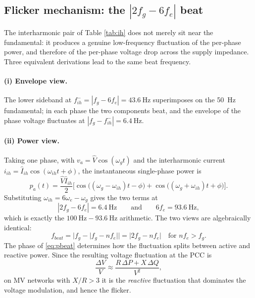\documentclass[11pt,a4paper]{article}
\begin{document}
\subsection{Flicker mechanism: the $|2f_{g}-6f_{e}|$ beat}
\label{sec:flicker}

The interharmonic pair of Table \ref{tab:ih} does not merely sit near the
fundamental: it produces a genuine low-frequency fluctuation of the per-phase
power, and therefore of the per-phase voltage drop across the supply impedance.
Three equivalent derivations lead to the same beat frequency.

\paragraph{(i) Envelope view.} The lower sideband at
$f_{ih}^{-}=|f_{g}-6f_{e}|=\SI{43.6}{\hertz}$ superimposes on the
\SI{50}{\hertz} fundamental; in each phase the two components beat, and the
envelope of the phase voltage fluctuates at $|f_{g}-f_{ih}^{-}|=\SI{6.4}{\hertz}$.

\paragraph{(ii) Power view.} Taking one phase, with
$v_{a}=\hat{V}\cos(\omega_{g}t)$ and the interharmonic current
$i_{ih}=\hat{I}_{ih}\cos(\omega_{ih}t+\phi)$, the instantaneous single-phase
power is
\begin{equation}
p_{a}(t)=\frac{\hat{V}\hat{I}_{ih}}{2}
\Big[\cos\big((\omega_{g}-\omega_{ih})t-\phi\big)
+\cos\big((\omega_{g}+\omega_{ih})t+\phi\big)\Big].
\label{eq:pbeat}
\end{equation}
Substituting $\omega_{ih}=6\omega_{e}-\omega_{g}$ gives the two terms at
\begin{equation}
|2f_{g}-6f_{e}| = \SI{6.4}{\hertz}
\qquad\text{and}\qquad
6f_{e} = \SI{93.6}{\hertz},
\end{equation}
which is exactly the $\SI{100}{\hertz}-\SI{93.6}{\hertz}$ arithmetic. The two
views are algebraically identical:
\begin{equation}
f_{beat}=\Big|f_{g}-\big|f_{g}-n f_{e}\big|\Big|
= \big|2f_{g}-n f_{e}\big| \quad\text{for } n f_{e}>f_{g}.
\label{eq:fbeat}
\end{equation}
The phase of \eqref{eq:pbeat} determines how the fluctuation splits between
active and reactive power. Since the resulting voltage fluctuation at the PCC is
\begin{equation}
\frac{\Delta V}{V}\approx\frac{R\,\Delta P+X\,\Delta Q}{V^{2}},
\end{equation}
on MV networks with $X/R>3$ it is the \emph{reactive} fluctuation that dominates
the voltage modulation, and hence the flicker.
\end{document}
